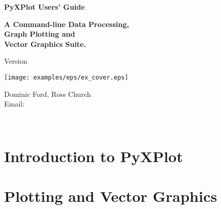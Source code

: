\documentclass[a4paper,onecolumn,10pt]{book}
\begin{document}
\begin{titlepage}
\normalsize
\vspace*{0.5cm}
\begin{center}
{\Huge \bf PyXPlot Users' Guide}\\
\end{center}
\vspace*{0.5cm}
\begin{center}
{\LARGE \bf A Command-line Data Processing, \\ \vspace{2mm} Graph Plotting and \\ \vspace{2mm} Vector Graphics Suite. \\}
\end{center}
\vspace*{0.5cm}
\begin{center}
{\Large Version \version \\}
\end{center}
\vspace*{0.0cm}
\begin{center}
\texttt{[image: examples/eps/ex\_cover.eps]}
\end{center}
\vspace*{0.0cm}
\begin{center}
{\Large Dominic Ford, Ross Church \\ \vspace{2mm} Email:  \\ }
\end{center}
\vspace*{0.5cm}
\begin{center}
{\Large \reldate \\}
\end{center}
\end{titlepage}


\tableofcontents

\listoffigures
{}

\newpage
{}

\part{Introduction to PyXPlot}






\part{Plotting and Vector Graphics}



\end{document}
